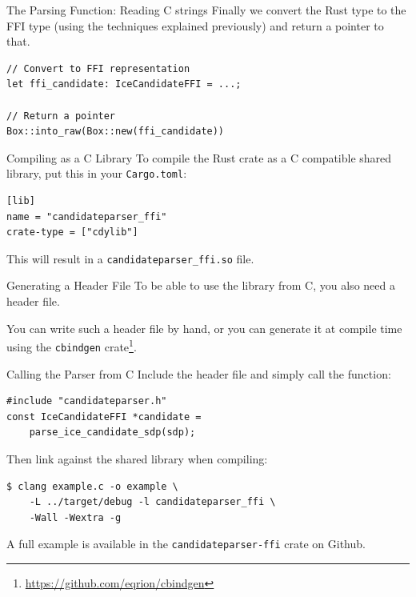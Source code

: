 \documentclass[aspectratio=1610,14pt,t]{beamer}
\begin{document}
\begin{frame}[c,fragile]{The Parsing Function: Reading C strings}
  Finally we convert the Rust type to the FFI type (using the techniques
  explained previously) and return a pointer to that.

  \begin{verbatim}
// Convert to FFI representation
let ffi_candidate: IceCandidateFFI = ...;

// Return a pointer
Box::into_raw(Box::new(ffi_candidate))
  \end{verbatim}
\end{frame}

\begin{frame}[c,fragile]{Compiling as a C Library}
  To compile the Rust crate as a C compatible shared library, put this in your
  \texttt{Cargo.toml}:

  \begin{verbatim}
[lib]
name = "candidateparser_ffi"
crate-type = ["cdylib"]
  \end{verbatim}

  This will result in a \texttt{candidateparser\_ffi.so} file.
\end{frame}

\begin{frame}[c]{Generating a Header File}
  To be able to use the library from C, you also need a header file.

  You can write such a header file by hand, or you can generate it at compile
  time using the \texttt{cbindgen} crate\footnote{\url{https://github.com/eqrion/cbindgen}}.

\end{frame}

\begin{frame}[c,fragile]{Calling the Parser from C}
  Include the header file and simply call the function:

  \begin{verbatim}
#include "candidateparser.h"
const IceCandidateFFI *candidate =
    parse_ice_candidate_sdp(sdp);
  \end{verbatim}

  Then link against the shared library when compiling:

  \begin{verbatim}
$ clang example.c -o example \
    -L ../target/debug -l candidateparser_ffi \
    -Wall -Wextra -g
  \end{verbatim}

  A full example is available in the \texttt{candidateparser-ffi} crate on
  Github.
\end{frame}
\end{document}
